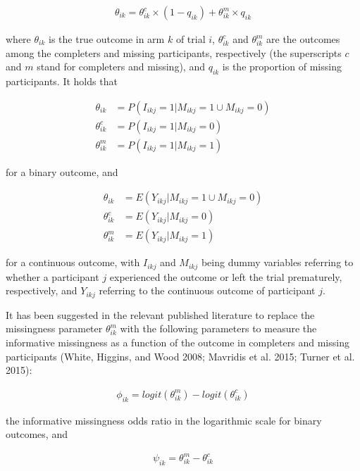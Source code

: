 \[\begin{aligned}
\theta_{ik} = \theta^{c}_{ik} \times (1 - q_{ik}) + \theta^{m}_{ik} \times q_{ik}
\end{aligned}\]

where \(\theta_{ik}\) is the true outcome in arm \(k\) of trial \(i\), \(\theta^{c}_{ik}\)
and \(\theta^{m}_{ik}\) are the outcomes among the completers and missing participants,
respectively (the superscripts \(c\) and \(m\) stand for completers and missing), and
\(q_{ik}\) is the proportion of missing participants. It holds that

\[\begin{aligned}
\theta_{ik} &= P(I_{ikj} = 1 | M_{ikj} = 1 \cup M_{ikj} = 0) \\
\theta^{c}_{ik} &= P(I_{ikj} = 1 | M_{ikj} = 0) \\
\theta^{m}_{ik} &= P(I_{ikj} = 1 | M_{ikj} = 1) 
\end{aligned}\]

for a binary outcome, and

\[\begin{aligned}
\theta_{ik} &= E(Y_{ikj} | M_{ikj} = 1 \cup M_{ikj} = 0) \\
\theta^{c}_{ik} &= E(Y_{ikj} | M_{ikj} = 0) \\
\theta^{m}_{ik} &= E(Y_{ikj} | M_{ikj} = 1) 
\end{aligned}\]

for a continuous outcome, with \(I_{ikj}\) and \(M_{ikj}\) being dummy variables
referring to whether a participant \(j\) experienced the outcome or left the trial
prematurely, respectively, and \(Y_{ikj}\) referring to the continuous outcome of
participant \(j\).

It has been suggested in the relevant published literature to replace the missingness
parameter \(\theta^{m}_{ik}\) with the following parameters to measure the informative
missingness as a function of the outcome in completers and missing participants
(White, Higgins, and Wood 2008; Mavridis et al. 2015; Turner et al. 2015):

\[\begin{aligned}
\phi_{ik} = logit(\theta^{m}_{ik}) - logit(\theta^{c}_{ik})
\end{aligned}\]

the informative missingness odds ratio in the logarithmic scale for binary outcomes,
and

\[\begin{aligned}
\psi_{ik} = \theta^{m}_{ik} - \theta^{c}_{ik}
\end{aligned}\]

